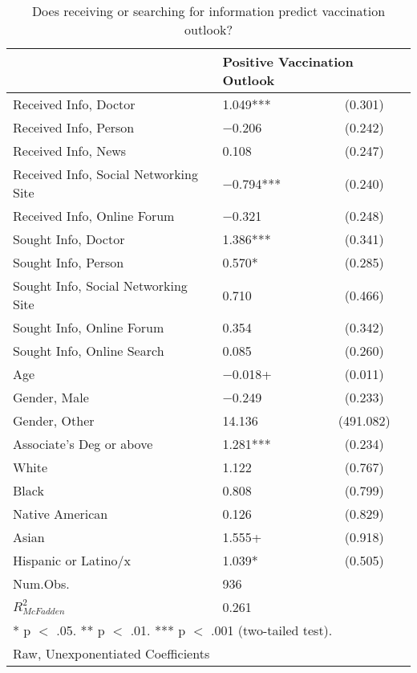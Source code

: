 \begin{table}[!ht]

\caption{\label{tab:table-model-3}Does receiving or searching for information predict vaccination outlook?}
\centering
\begin{tabular}{llc}
\toprule
  & \multicolumn{2}{l}{Positive Vaccination Outlook}\\
\midrule
Received Info, Doctor & \num{1.049}*** &  (\num{0.301})\\
Received Info, Person & \num{-0.206} &  (\num{0.242})\\
Received Info, News & \num{0.108}  & (\num{0.247})\\
Received Info, Social Networking Site & \num{-0.794}***  & (\num{0.240})\\
Received Info, Online Forum & \num{-0.321}  & (\num{0.248})\\
Sought Info, Doctor & \num{1.386}*** &  (\num{0.341})\\
Sought Info, Person & \num{0.570}*  & (\num{0.285})\\
Sought Info, Social Networking Site & \num{0.710}  & (\num{0.466})\\
Sought Info, Online Forum & \num{0.354}  & (\num{0.342})\\
Sought Info, Online Search & \num{0.085}  & (\num{0.260})\\
Age & \num{-0.018}+  & (\num{0.011})\\
Gender, Male & \num{-0.249}  & (\num{0.233})\\
Gender, Other & \num{14.136}  & (\num{491.082})\\
Associate's Deg or above & \num{1.281}***  & (\num{0.234})\\
White & \num{1.122}  & (\num{0.767})\\
Black & \num{0.808} &  (\num{0.799})\\
Native American & \num{0.126}  & (\num{0.829})\\
Asian & \num{1.555}+  & (\num{0.918})\\
Hispanic or Latino/x & \num{1.039}*  & (\num{0.505})\\
Num.Obs. & \num{936} & \\
\midrule
$R_{McFadden}^2$ & \num{0.261}\\
\bottomrule
\multicolumn{3}{l}{\rule{0pt}{1em}* p $<$ .05. ** p $<$ .01. *** p $<$ .001 (two-tailed test).}\\
\multicolumn{3}{l}{\rule{0pt}{1em}Raw, Unexponentiated Coefficients}\\
\end{tabular}
\end{table}